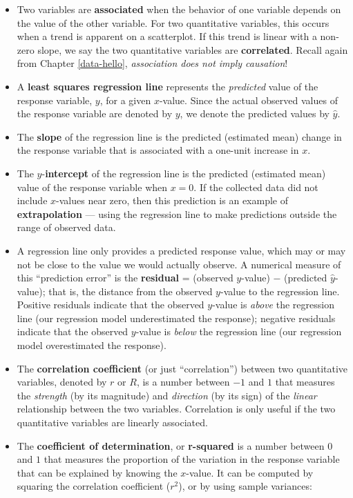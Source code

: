 \documentclass[
  10pt,
  openany]{book}
\theoremstyle{definition}
\theoremstyle{definition}
\theoremstyle{definition}
\theoremstyle{definition}
\theoremstyle{remark}
\begin{document}
\begin{itemize}
\item
  Two variables are \textbf{associated} when the behavior of one variable depends on the value of the other variable. For two quantitative variables, this occurs when a trend is apparent on a scatterplot. If this trend is linear with a non-zero slope, we say the two quantitative variables are \textbf{correlated}. Recall again from Chapter \ref{data-hello}, \emph{association does not imply causation}!
\item
  A \textbf{least squares regression line} represents the \emph{predicted} value of the response variable, \(y\), for a given \(x\)-value. Since the actual observed values of the response variable are denoted by \(y\), we denote the predicted values by \(\hat{y}\).
\item
  The \textbf{slope} of the regression line is the predicted (estimated mean) change in the response variable that is associated with a one-unit increase in \(x\).
\item
  The \(y\)-\textbf{intercept} of the regression line is the predicted (estimated mean) value of the response variable when \(x = 0\). If the collected data did not include \(x\)-values near zero, then this prediction is an example of \textbf{extrapolation} --- using the regression line to make predictions outside the range of observed data.
\item
  A regression line only provides a predicted response value, which may or may not be close to the value we would actually observe. A numerical measure of this ``prediction error'' is the \textbf{residual} = (observed \(y\)-value) \(-\) (predicted \(\hat{y}\)-value); that is, the distance from the observed \(y\)-value to the regression line. Positive residuals indicate that the observed \(y\)-value is \emph{above} the regression line (our regression model underestimated the response); negative residuals indicate that the observed \(y\)-value is \emph{below} the regression line (our regression model overestimated the response).
\item
  The \textbf{correlation coefficient} (or just ``correlation'') between two quantitative variables, denoted by \(r\) or \(R\), is a number between \(-1\) and \(1\) that measures the \emph{strength} (by its magnitude) and \emph{direction} (by its sign) of the \emph{linear} relationship between the two variables. Correlation is only useful if the two quantitative variables are linearly associated.
\item
  The \textbf{coefficient of determination}, or \textbf{r-squared} is a number between \(0\) and \(1\) that measures the proportion of the variation in the response variable that can be explained by knowing the \(x\)-value. It can be computed by squaring the correlation coefficient (\(r^2\)), or by using sample variances:

\end{itemize}
\end{document}
